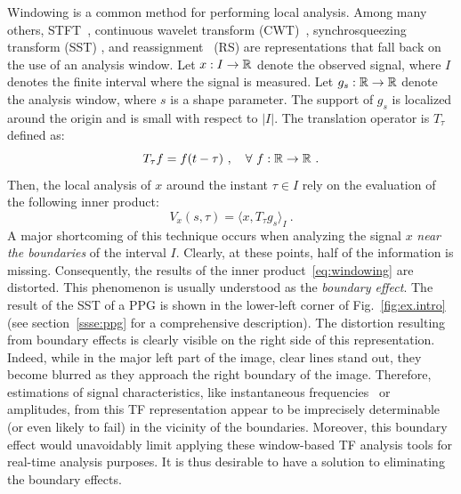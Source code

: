 \documentclass[journal]{IEEEtran}
\begin{document}
Windowing is a common method for performing local analysis. Among many others, STFT~\cite{Flandrin:1999}, continuous wavelet transform (CWT)~\cite{Da1992}, synchrosqueezing transform (SST) \cite{Daubechies11synchrosqueezed}, and reassignment~\cite{Auger13time} (RS) are representations that fall back on the use of an analysis window. Let $x:I\to{\mathbb R}$ denote the observed signal, where $I$ denotes the finite interval where the signal is measured. Let $g_s:{\mathbb R}\to{\mathbb R}$ denote the analysis window, where $s$ is a shape parameter. The support of $g_s$ is localized around the origin and is small with respect to $|I|$. The translation operator is $T_\tau$ defined as:
\[
T_\tau f = f(t-\tau)\ ,\quad \forall\ f:{\mathbb R}\to{\mathbb R}\ .
\]
Then, the local analysis of $x$ around the instant $\tau\in I$ rely on the evaluation of the following inner product:
\begin{equation}
V_x(s,\tau) = \langle x, T_\tau g_s \rangle_I \ .
\label{eq:windowing}
\end{equation}
A major shortcoming of this technique occurs when analyzing the signal $x$ {\em near the boundaries} of the interval $I$. Clearly, at these points, half of the information is missing. Consequently, the results of the inner product~\eqref{eq:windowing} are distorted. This phenomenon is usually understood as the \emph{boundary effect}. The result of the SST of a PPG is shown in the lower-left corner of Fig.~\ref{fig:ex.intro} (see section~\ref{ssse:ppg} for a comprehensive description). The distortion resulting from boundary effects is clearly visible on the right side of this representation. Indeed, while in the major left part of the image, clear lines stand out, they become blurred as they approach the right boundary of the image. Therefore, estimations of signal characteristics, like instantaneous frequencies~\cite{Delprat92asymptotic} or amplitudes, from this TF representation appear to be imprecisely determinable (or even likely to fail) in the vicinity of the boundaries. Moreover, this boundary effect would unavoidably limit applying these window-based TF analysis tools for real-time analysis purposes. It is thus desirable to have a solution to eliminating the boundary effects.
\end{document}
